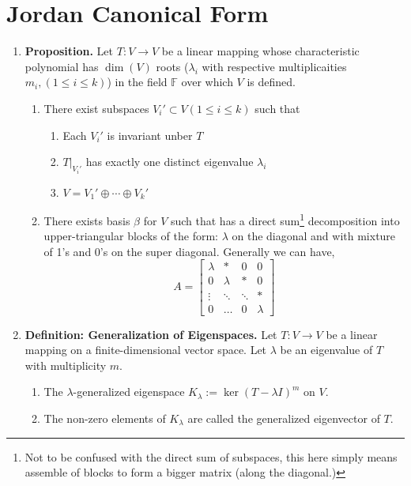 \documentclass[oneside, 12pt]{book}
\newcommand{\settag}[1]{\renewcommand{\theenumi}{#1}}
\newcommand{\field}{\mathbb{F}}
\newcommand{\tbf}[1]{\textbf{#1}}
\newcommand{\trans}[3]{$#1:#2\rightarrow{}#3$}
\newcommand{\map}[3]{\text{$\left[#1\right]_{#2}^{#3}$}}
\newcommand{\para}[1]{\item \tbf{#1}}
\begin{document}
\section{Jordan Canonical Form}
\begin{enumerate}
    \settag{6.3.1}
    \para{Proposition.} Let \trans{T}{V}{V} be a linear mapping whose characteristic polynomial has $\dim(V)$ roots ($\lambda_i$ with respective multiplicaities $m_i, (1\leq i\leq k)$)
    in the field $\field$ over which $V$ is defined.
    \begin{enumerate}
        \item There exist subspaces $V_i'\subset V(1\leq i \leq k)$ such that
        \begin{enumerate}
            \item Each $V_i'$ is invariant unber $T$
            \item $T|_{V_i'}$ has exactly one distinct eigenvalue $\lambda_i$
            \item $V = V_1' \oplus \cdots \oplus V_k'$
        \end{enumerate}
        \item There exists basis $\beta$ for $V$ such that \map{T}{\beta}{\beta} has a direct sum\footnote{Not to be confused with the direct sum of subspaces, 
        this here simply means assemble of blocks to form a bigger matrix (along the diagonal.)} decomposition into upper-triangular blocks of the form: $\lambda$ on the diagonal
        and with mixture of 1's and 0's on the super diagonal. Generally we can have,
        \begin{equation*}
            A = 
            \begin{bmatrix}
                \lambda  & * & 0 & 0  \\
                0 & \lambda & * & 0 \\
                \vdots & \ddots & \ddots& * \\
                0 & \hdots &  0 & \lambda
            \end{bmatrix}
        \end{equation*}
    \end{enumerate}

    \settag{6.3.2}
    \para{Definition: Generalization of Eigenspaces.} Let \trans{T}{V}{V} be a linear mapping on a finite-dimensional vector space. Let $\lambda$ be an eigenvalue of $T$ with multiplicity $m$.
    \begin{enumerate}
        \item The $\lambda$-generalized eigenspace $K_\lambda := \ker(T-\lambda I)^m$ on $V$.
        \item The non-zero elements of $K_\lambda$ are called the generalized eigenvector of $T$.
    \end{enumerate}

\end{enumerate}
\end{document}
